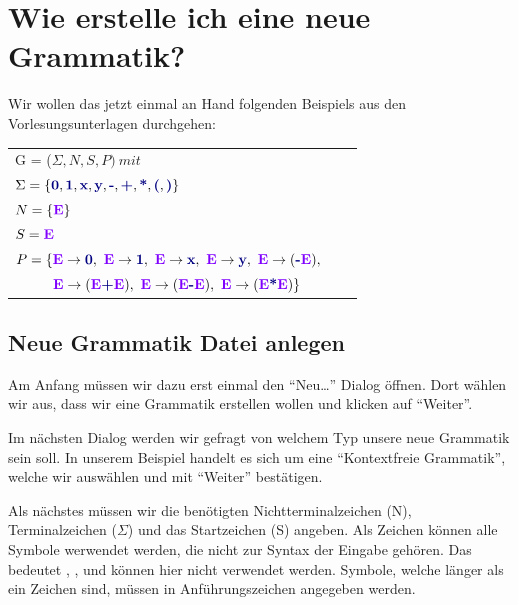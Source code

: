 \chapter{Wie erstelle ich eine neue Grammatik?}\label{Grammar}

Wir wollen das jetzt einmal an Hand folgenden Beispiels aus den
Vorlesungsunterlagen durchgehen:\vspace{10pt}


\begin{tabular}{lcr}
G = ($\Sigma, N, S, P )\ mit $\\
$\Sigma = \{\TerminalSymbol{0}, \TerminalSymbol{1}, \TerminalSymbol{x},
\TerminalSymbol{y}, \TerminalSymbol{-}, \TerminalSymbol{+},
\TerminalSymbol{*}, \TerminalSymbol{(}, \TerminalSymbol{)}\}$\\ $N =
\{\StartSymbol{E}\}$\\ $S=\StartSymbol{E}$\\
$P = \{\StartSymbol{E} \to \TerminalSymbol{0},\ \StartSymbol{E} \to \TerminalSymbol{1},\
\StartSymbol{E}	\to \TerminalSymbol{x},\ \StartSymbol{E} \to \TerminalSymbol{y},\
\StartSymbol{E} \to (\TerminalSymbol{-}\StartSymbol{E}),$\\
$\ \ \ \ \ \ \ \ \StartSymbol{E} \to (\StartSymbol{E} \TerminalSymbol{+}
\StartSymbol{E}),\ \StartSymbol{E} \to (\StartSymbol{E} \TerminalSymbol{-} \StartSymbol{E}),\
\StartSymbol{E} \to (\StartSymbol{E} \TerminalSymbol{*} \StartSymbol{E})\}$\\
\end{tabular}

\section{Neue Grammatik Datei anlegen}

Am Anfang müssen wir dazu erst einmal den "`Neu\ldots"' Dialog öffnen. Dort
wählen wir aus, dass wir eine Grammatik erstellen wollen und klicken auf
"`Weiter"'.\vspace{10pt}

Im nächsten Dialog werden wir gefragt von welchem Typ unsere neue Grammatik
sein soll. In unserem Beispiel handelt es sich um eine "`Kontextfreie
Grammatik"', welche wir auswählen und mit "`Weiter"' bestätigen.\vspace{10pt}

Als nächstes müssen wir die benötigten Nichtterminalzeichen (N),
Terminalzeichen ($\Sigma$) und das Startzeichen (S) angeben.  Als Zeichen
können alle Symbole werwendet werden, die nicht zur Syntax der Eingabe gehören.
Das bedeutet \Symbol{,}, \Symbol{\{}, \Symbol{\}} und \SymbolEmpty{}
können hier nicht verwendet werden. Symbole, welche länger als ein Zeichen sind,
müssen in Anführungszeichen angegeben werden.\vspace{10pt}

